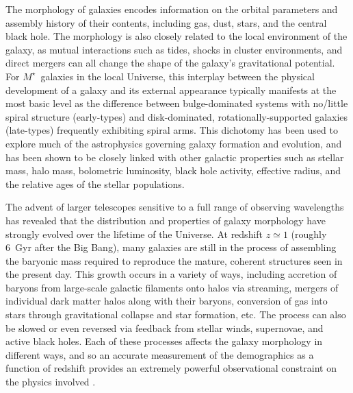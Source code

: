 \documentclass[a4paper,fleqn,usenatbib]{mnras}
\begin{document}
The morphology of galaxies encodes information on the orbital parameters and
assembly history of their contents, including gas, dust, stars, and the central
black hole. The morphology is also closely related to the local environment of
the galaxy, as mutual interactions such as tides, shocks in cluster
environments, and direct mergers can all change the shape of the galaxy's
gravitational potential. For $M^\star$~galaxies in the local Universe, this
interplay between the physical development of a galaxy and its external
appearance typically manifests at the most basic level as the difference
between bulge-dominated systems with no/little spiral structure (early-types)
and disk-dominated, rotationally-supported galaxies (late-types) frequently
exhibiting spiral arms.  This dichotomy has been used to explore much of the
astrophysics governing galaxy formation and evolution, and has been shown to be
closely linked with other galactic properties such as stellar mass, halo mass,
bolometric luminosity, black hole activity, effective radius, and the relative
ages of the stellar populations.

The advent of larger telescopes sensitive to a full range of observing wavelengths
has revealed that the distribution and properties of galaxy morphology have
strongly evolved over the lifetime of the Universe. At redshift $z\simeq1$
(roughly 6~Gyr after the Big Bang), many galaxies are still in the process of
assembling the baryonic mass required to reproduce the mature, coherent
structures seen in the present day. This growth occurs in a variety of
ways, including accretion of baryons from large-scale galactic filaments
onto halos via streaming, mergers of individual dark matter halos along with
their baryons, conversion of gas into stars through gravitational collapse and
star formation, etc. The process can also be slowed or even reversed via
feedback from stellar winds, supernovae, and active black holes.  Each of these
processes affects the galaxy morphology in different ways, and so an accurate
measurement of the demographics as a function of redshift provides an extremely
powerful observational constraint on the physics involved \citep[for recent
reviews see][]{but13,con14}. 
\end{document}
